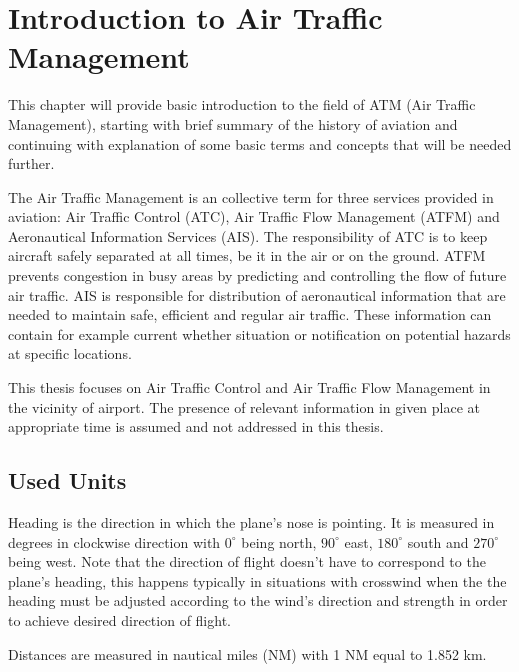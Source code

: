 \chapter{Introduction to Air Traffic Management}

\label{section:sota}

This chapter will provide basic introduction to the field of ATM (Air Traffic Management), starting with brief summary of the history of aviation and continuing with explanation of some basic terms and concepts that will be needed further.

The Air Traffic Management is an collective term for three services provided in aviation: Air Traffic Control (ATC), Air Traffic Flow Management (ATFM) and Aeronautical Information Services (AIS). The responsibility of ATC is to keep aircraft safely separated at all times, be it in the air or on the ground. ATFM prevents congestion in busy areas by predicting and controlling the flow of future air traffic. AIS is responsible for distribution of aeronautical information that are needed to maintain safe, efficient and regular air traffic. These information can contain for example current whether situation or notification on potential hazards at specific locations. \cite{atm}

This thesis focuses on Air Traffic Control and Air Traffic Flow Management in the vicinity of airport. The presence of relevant information in given place at appropriate time is assumed and not addressed in this thesis.







\section{Used Units}

Heading is the direction in which the plane's nose is pointing. It is measured in degrees in clockwise direction with $0 ^{\circ}$ being north, $90 ^{\circ}$ east, $180 ^{\circ}$ south and $270 ^{\circ}$ being west. Note that the direction of flight doesn't have to correspond to the plane's heading, this happens typically in situations with crosswind when the the heading must be adjusted according to the wind's direction and strength in order to achieve desired direction of flight.

Distances are measured in nautical miles (NM) with 1 NM equal to 1.852 km.

